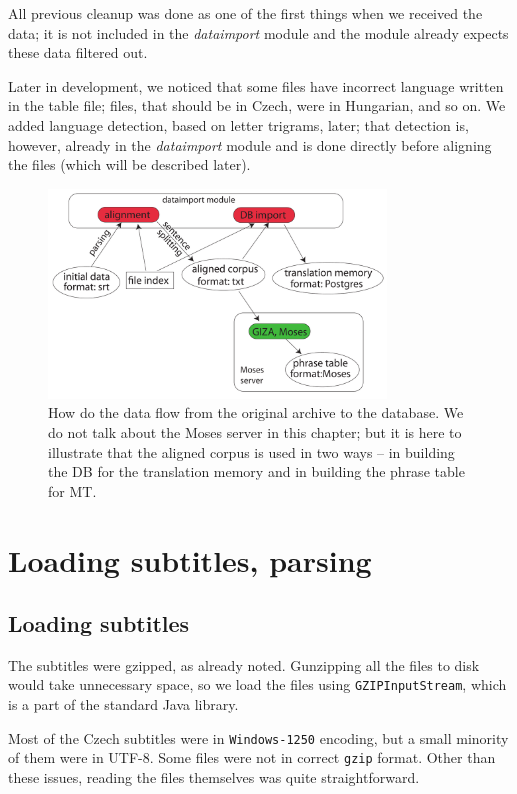 All previous cleanup was done as one of the first things when we received the data; it is not included in the \emph{dataimport} module and the module already expects these data filtered out.

Later in development, we noticed that some files have incorrect language written in the table file; files, that should be in Czech, were in  Hungarian, and so on. We added language detection, based on letter trigrams, later; that detection is, however, already in the \emph{dataimport} module and is done directly before aligning the files (which will be described later).


\begin{figure}[t]
\begin{center}
\includegraphics[width=0.8\textwidth]{figures/data_flow.pdf}
\end{center}
\caption{How do the data flow from the original archive to the database. We do not talk about the Moses server in this chapter; but it is here to illustrate that the aligned corpus is used in two ways -- in building the DB for the translation memory and in building the phrase table for MT.}\label{dataflow}
\end{figure}

\section{Loading subtitles, parsing}
\label{parsing_subs}
\subsection*{Loading subtitles}
The subtitles were gzipped, as already noted. Gunzipping all the files to disk would take unnecessary space, so we load the files using \texttt{GZIPInputStream}, which is a part of the standard Java library.

Most of the Czech subtitles were in \texttt{Windows-1250} encoding, but a small minority of them were in UTF-8. Some files were not in correct \texttt{gzip} format. Other than these issues, reading the files themselves was quite straightforward.

